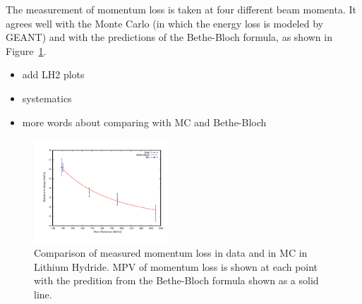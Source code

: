 The measurement of momentum loss is taken at four different beam momenta.  It agrees well with the Monte Carlo (in which the energy loss is modeled by GEANT) and with the predictions of the Bethe-Bloch formula, as shown in Figure~\ref{fig:eloss_bb}.

{\color{red}
\begin{itemize}
\item add LH2 plots
\item systematics
\item more words about comparing with MC and Bethe-Bloch
\end{itemize}
}

\begin{figure}
\hfil\includegraphics[width=0.45\textwidth]{11-Absorber/Figures/bb_compare.pdf}\hfil

\caption{\label{fig:eloss_bb} Comparison of measured momentum loss in data and in MC in Lithium Hydride.  MPV of momentum loss is shown at each point with the predition from the Bethe-Bloch formula shown as a solid line.}
\end{figure}


